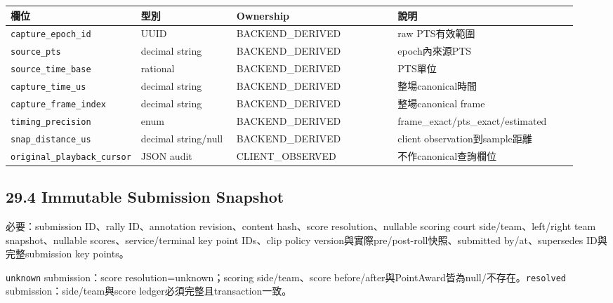 \documentclass[
  9pt,
  a4paper,
]{article}
\begin{document}
\begin{longtable}[]{@{}>{\RaggedRight\arraybackslash}p{0.11\linewidth}>{\RaggedRight\arraybackslash}p{0.19\linewidth}>{\RaggedRight\arraybackslash}p{0.31\linewidth}>{\RaggedRight\arraybackslash}p{0.33\linewidth}@{}}
\toprule\noalign{}
欄位 & 型別 & Ownership & 說明 \\
\midrule\noalign{}
\endhead
\bottomrule\noalign{}
\endlastfoot
\texttt{capture\_\allowbreak{}epoch\_\allowbreak{}id} & UUID & BACKEND\_\allowbreak{}DERIVED & raw
PTS有效範圍 \\
\texttt{source\_\allowbreak{}pts} & decimal string & BACKEND\_\allowbreak{}DERIVED &
epoch內來源PTS \\
\texttt{source\_\allowbreak{}time\_\allowbreak{}base} & rational & BACKEND\_\allowbreak{}DERIVED & PTS單位 \\
\texttt{capture\_\allowbreak{}time\_\allowbreak{}us} & decimal string & BACKEND\_\allowbreak{}DERIVED &
整場canonical時間 \\
\texttt{capture\_\allowbreak{}frame\_\allowbreak{}index} & decimal string & BACKEND\_\allowbreak{}DERIVED &
整場canonical frame \\
\texttt{timing\_\allowbreak{}precision} & enum & BACKEND\_\allowbreak{}DERIVED &
frame\_\allowbreak{}exact/pts\_\allowbreak{}exact/estimated \\
\texttt{snap\_\allowbreak{}distance\_\allowbreak{}us} & decimal string/null & BACKEND\_\allowbreak{}DERIVED &
client observation到sample距離 \\
\texttt{original\_\allowbreak{}playback\_\allowbreak{}cursor} & JSON audit & CLIENT\_\allowbreak{}OBSERVED &
不作canonical查詢欄位 \\
\end{longtable}

\subsection{29.4 Immutable Submission
Snapshot}\label{294-immutable-submission-snapshot}

必要：submission ID、rally ID、annotation revision、content hash、score
resolution、nullable scoring court side/team、left/right team
snapshot、nullable scores、service/terminal key point IDs、clip policy
version與實際pre/post-roll快照、submitted by/at、supersedes
ID與完整submission key points。

\texttt{unknown} submission：score resolution=unknown；scoring
side/team、score
before/after與PointAward皆為null/不存在。\texttt{resolved}
submission：side/team與score ledger必須完整且transaction一致。
\end{document}
